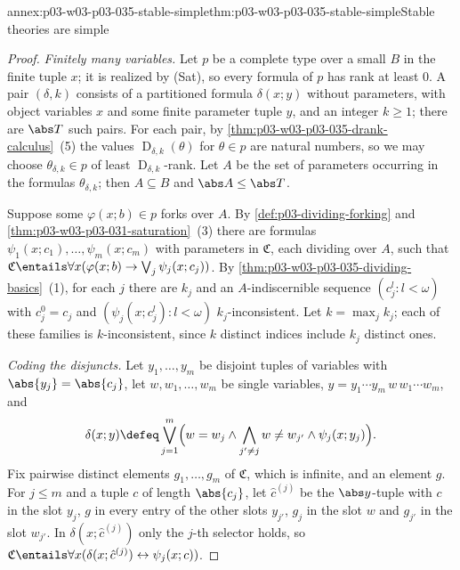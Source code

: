 \begin{annexitem}{annex:p03-w03-p03-035-stable-simple}{thm:p03-w03-p03-035-stable-simple}{Stable theories are simple}
\begin{proof}
\emph{Finitely many variables.}  Let \(p\) be a complete type over a small
\(B\) in the finite tuple \(x\); it is realized by (Sat), so every formula of
\(p\) has rank at least \(0\).  A pair \((\delta,k)\) consists of a
partitioned formula \(\delta(x;y)\) without parameters, with object
variables \(x\) and some finite parameter tuple \(y\), and an integer
\(k\geq1\); there are \(\abs T\) such pairs.  For each pair, by
\cref{thm:p03-w03-p03-035-drank-calculus}~(5) the values
\(\operatorname D_{\delta,k}(\theta)\) for \(\theta\in p\) are natural
numbers, so we may choose \(\theta_{\delta,k}\in p\) of least
\(\operatorname D_{\delta,k}\)-rank.  Let \(A\) be the set of parameters
occurring in the formulas \(\theta_{\delta,k}\); then \(A\subseteq B\) and
\(\abs A\leq\abs T\).

Suppose some \(\varphi(x;b)\in p\) forks over \(A\).  By
\cref{def:p03-dividing-forking} and \cref{thm:p03-w03-p03-031-saturation}~(3)
there are formulas \(\psi_1(x;c_1),\ldots,\psi_m(x;c_m)\) with parameters in
\(\mathfrak C\), each dividing over \(A\), such that
\(\mathfrak C\entails\forall x(\varphi(x;b)\rightarrow\bigvee_{j}\psi_j(x;c_j))\).
By \cref{thm:p03-w03-p03-035-dividing-basics}~(1), for each \(j\) there are
\(k_j\) and an \(A\)-indiscernible sequence \((c^l_j:l<\omega)\) with
\(c^0_j=c_j\) and \((\psi_j(x;c^l_j):l<\omega)\) \(k_j\)-inconsistent.  Let
\(k=\max_j k_j\); each of these families is \(k\)-inconsistent, since \(k\)
distinct indices include \(k_j\) distinct ones.

\emph{Coding the disjuncts.}  Let \(y_1,\ldots,y_m\) be disjoint tuples of
variables with \(\abs{y_j}=\abs{c_j}\), let \(w,w_1,\ldots,w_m\) be single
variables, \(y=y_1\cdots y_m\,w\,w_1\cdots w_m\), and
\[
  \delta(x;y)\defeq\bigvee_{j=1}^{m}\Bigl(w=w_j\wedge
  \bigwedge_{j'\neq j}w\neq w_{j'}\wedge\psi_j(x;y_j)\Bigr).
\]
Fix pairwise distinct elements \(g_1,\ldots,g_m\) of \(\mathfrak C\), which is
infinite, and an element \(g\).  For \(j\leq m\) and a tuple \(c\) of length
\(\abs{c_j}\), let \(\hat c^{(j)}\) be the \(\abs y\)-tuple with \(c\) in the
slot \(y_j\), \(g\) in every entry of the other slots \(y_{j'}\), \(g_j\) in
the slot \(w\) and \(g_{j'}\) in the slot \(w_{j'}\).  In \(\delta(x;\hat
c^{(j)})\) only the \(j\)-th selector holds, so
\(\mathfrak C\entails\forall x(\delta(x;\hat c^{(j)})\leftrightarrow
\psi_j(x;c))\).


\end{proof}
\end{annexitem}
